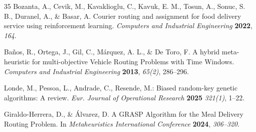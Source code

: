 \documentclass[runningheads]{llncs}
\begin{document}
\begin{thebibliography}{35}
Bozanta, A., Cevik, M., Kavaklioglu, C., Kavuk, E. M., Tosun, A., Sonuc, S. B., Duranel, A., \& Basar, A. Courier routing and assignment for food delivery service using reinforcement learning. {\em Computers and Industrial Engineering} {\bf 2022}, {\em 164}.

Baños, R., Ortega, J., Gil, C., Márquez, A. L., \& De Toro, F. A hybrid meta-heuristic for multi-objective Vehicle Routing Problems with Time Windows. {\em Computers and Industrial Engineering} {\bf 2013}, {\em 65(2)}, 286--296.

Londe, M., Pessoa, L., Andrade, C., Resende, M.: Biased random-key genetic algorithms: A review. {\em Eur. Journal of Operational Research} {\bf 2025} {\em 321(1)}, 1--22.

Giraldo-Herrera, D., \& Álvarez, D. A GRASP Algorithm for the Meal Delivery Routing Problem. In {\em Metaheuristics International Conference} {\bf 2024}, {\em 306--320}.


\end{thebibliography}
\end{document}
